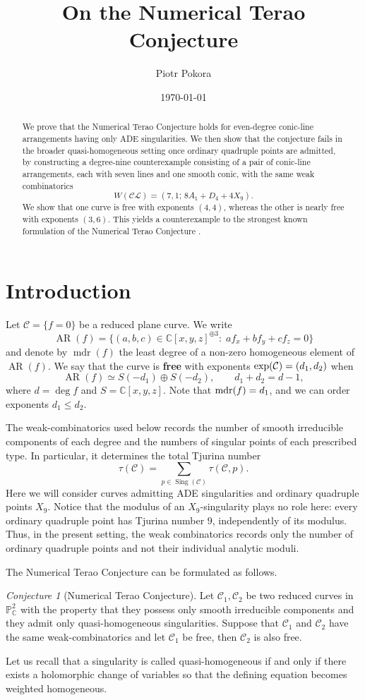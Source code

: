 \documentclass[11pt]{article}
\title{On the Numerical Terao Conjecture}
\author{Piotr Pokora}
\date{\today}
\theoremstyle{remark}
\newtheorem{conjecture}[theorem]{Conjecture}
\newcommand{\mdr}{\operatorname{mdr}}
\newcommand{\AR}{\operatorname{AR}}
\newcommand{\Sing}{\operatorname{Sing}}
\begin{document}
\maketitle

\begin{abstract}
We prove that the Numerical Terao Conjecture holds for even-degree conic-line arrangements having only ADE singularities. We then show that the conjecture fails in the broader quasi-homogeneous setting once ordinary quadruple points are admitted, by constructing a degree-nine counterexample consisting of a pair of conic-line arrangements, each with seven lines and one smooth conic, with the same weak combinatorics
\[
W(\mathcal{CL}) = (7,1;\,8A_1+D_4+4X_9).
\]
We show that one curve is free with exponents $(4,4)$, whereas the other is nearly free with exponents $(3,6)$. This yields a counterexample to the strongest known formulation of the Numerical Terao Conjecture \cite{CP}.
\end{abstract}

\section{Introduction}

Let $\mathcal{C} = \{f=0\}$ be a reduced plane curve. We write
\[
 \AR(f)=\{(a,b,c)\in \mathbb C[x,y,z]^{\oplus 3}:\;af_x+bf_y+cf_z=0\}
\]
and denote by $\mdr(f)$ the least degree of a non-zero homogeneous element of $\AR(f)$.  We say that the curve is \textbf{free} with exponents ${\rm exp}(\mathcal{C}) = (d_1,d_2)$ when
\[
 \AR(f)\simeq S(-d_1)\oplus S(-d_2),\qquad d_1+d_2=d-1,
\]
where $d=\deg f$ and $S=\mathbb C[x,y,z]$. Note that ${\rm mdr}(f) = d_{1}$, and we can order exponents $d_{1} \leq d_{2}$.

The weak-combinatorics used below records the number of smooth irreducible
components of each degree and the numbers of singular points of each prescribed
type. In particular, it determines the total Tjurina number
\[
 \tau(\mathcal C)=\sum_{p\in\Sing(\mathcal C)}\tau(\mathcal C,p).
\]
Here we will consider curves admitting ADE singularities and ordinary quadruple points $X_{9}$. Notice that the modulus of an $X_9$-singularity plays no role here: every
ordinary quadruple point has Tjurina number $9$, independently of its modulus.
Thus, in the present setting, the weak combinatorics records only the number
of ordinary quadruple points and not their individual analytic moduli.

The Numerical Terao Conjecture can be formulated as follows.
\begin{conjecture}[Numerical Terao Conjecture]
Let $\mathcal{C}_{1}, \mathcal{C}_{2}$ be two reduced curves in $\mathbb{P}^{2}_{\mathbb{C}}$ with the property that they possess only smooth irreducible components and they admit only quasi-homogeneous singularities. Suppose that $\mathcal{C}_{1}$ and $\mathcal{C}_{2}$ have the same weak-combinatorics and let $\mathcal{C}_{1}$ be free, then $\mathcal{C}_{2}$ is also free.
\end{conjecture}
Let us recall that a singularity is called quasi-homogeneous if and only if there exists a holomorphic change of variables so that the defining equation becomes weighted homogeneous. 
\end{document}
